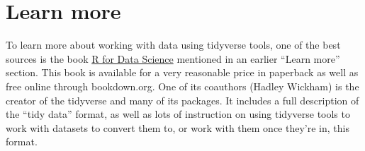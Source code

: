 \documentclass[]{tufte-book}
\newenvironment{Shaded}{}{}
\newcommand{\DataTypeTok}[1]{\textcolor[rgb]{0.56,0.13,0.00}{#1}}
\newcommand{\DecValTok}[1]{\textcolor[rgb]{0.25,0.63,0.44}{#1}}
\newcommand{\KeywordTok}[1]{\textcolor[rgb]{0.00,0.44,0.13}{\textbf{#1}}}
\newcommand{\NormalTok}[1]{#1}
\newcommand{\OperatorTok}[1]{\textcolor[rgb]{0.40,0.40,0.40}{#1}}
\newcommand{\StringTok}[1]{\textcolor[rgb]{0.25,0.44,0.63}{#1}}
\begin{document}
\begin{Shaded}
\end{Shaded}

\hypertarget{learn-more-4}{%
\section{Learn more}\label{learn-more-4}}

To learn more about working with data using tidyverse tools, one of the best sources is the
book \href{https://r4ds.had.co.nz/}{R for Data Science} mentioned in an earlier ``Learn more'' section.
This book is available
for a very reasonable price in paperback as well as free online through bookdown.org. One
of its coauthors (Hadley Wickham) is the creator of the tidyverse and many of its packages.
It includes a full description of the ``tidy data'' format, as well as lots of instruction on
using tidyverse tools to work with datasets to convert them to, or work with them once they're
in, this format.
\end{document}
